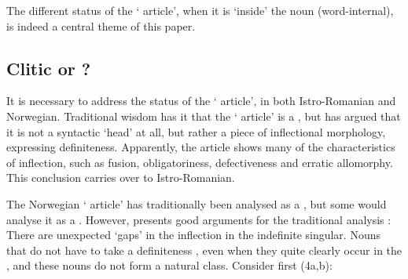 \documentclass[output=paper]{langsci/langscibook}
\begin{document}
The different status of the ` article', when it is `inside' the
noun (word-internal), is indeed a central theme of this paper.

\subsection{Clitic or ?}
\label{sec:enger:2.3}

It is necessary to address the status of the ` article', in both
Istro-Romanian and Norwegian. Traditional wisdom has it that the
 ` article' is a , but %
\citet{Ledgeway16,Ledgeway16b} %
%
has
argued that it is not a syntactic `head' at all, but rather a piece of
inflectional morphology, expressing definiteness. Apparently, the
  article shows many of the characteristics of
inflection, such as fusion, obligatoriness, defectiveness and erratic
allomorphy. This conclusion carries over to Istro-Romanian.

The Norwegian ` article' has traditionally been analysed as a
, but some would analyse it as a  %
\citep[e.g.][]{Lahiri05}%
%
.
However, %
\citet{Lodrup16} %
%
presents good arguments for the traditional
 analysis %
\citep[cf. also][]{Faarlund09}%
%
: There are unexpected `gaps' in
the inflection in the indefinite singular. Nouns that do not have to
take a definiteness , even when they quite clearly occur in the
, and these nouns do not form a natural class. Consider first
(4a,b):
\end{document}
